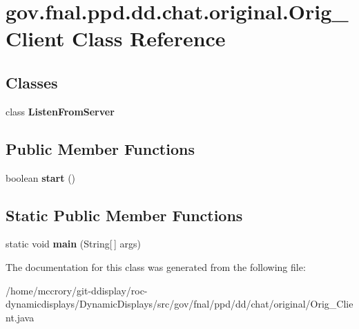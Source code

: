 \hypertarget{classgov_1_1fnal_1_1ppd_1_1dd_1_1chat_1_1original_1_1Orig__Client}{\section{gov.\-fnal.\-ppd.\-dd.\-chat.\-original.\-Orig\-\_\-\-Client Class Reference}
\label{classgov_1_1fnal_1_1ppd_1_1dd_1_1chat_1_1original_1_1Orig__Client}
}
\subsection*{Classes}
\begin{DoxyCompactItemize}
\item 
class {\bfseries Listen\-From\-Server}
\end{DoxyCompactItemize}
\subsection*{Public Member Functions}
\begin{DoxyCompactItemize}
\item 
\hypertarget{classgov_1_1fnal_1_1ppd_1_1dd_1_1chat_1_1original_1_1Orig__Client_adf63b9f86aaf9b4bf5387b1a5b12a1f1}{boolean {\bfseries start} ()}\label{classgov_1_1fnal_1_1ppd_1_1dd_1_1chat_1_1original_1_1Orig__Client_adf63b9f86aaf9b4bf5387b1a5b12a1f1}

\end{DoxyCompactItemize}
\subsection*{Static Public Member Functions}
\begin{DoxyCompactItemize}
\item 
\hypertarget{classgov_1_1fnal_1_1ppd_1_1dd_1_1chat_1_1original_1_1Orig__Client_a72c41e526aaa03314dd5bba2d5d51a5e}{static void {\bfseries main} (String\mbox{[}$\,$\mbox{]} args)}\label{classgov_1_1fnal_1_1ppd_1_1dd_1_1chat_1_1original_1_1Orig__Client_a72c41e526aaa03314dd5bba2d5d51a5e}

\end{DoxyCompactItemize}


The documentation for this class was generated from the following file\-:\begin{DoxyCompactItemize}
\item 
/home/mccrory/git-\/ddisplay/roc-\/dynamicdisplays/\-Dynamic\-Displays/src/gov/fnal/ppd/dd/chat/original/Orig\-\_\-\-Client.\-java\end{DoxyCompactItemize}
